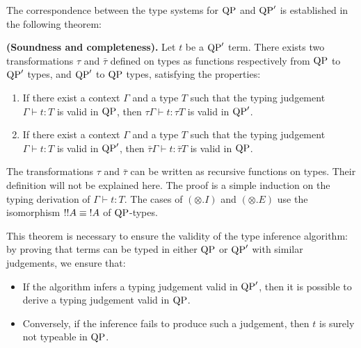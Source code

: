The correspondence between the type systems for ${\rm QP}$ and ${\rm QP}'$ is established in the following theorem:

\begin{thm}{\bf (Soundness and completeness).} Let $t$ be a ${\rm QP}'$ term. There exists two transformations $\tau$ and
	$\bar \tau$ defined on types as functions respectively from ${\rm QP}$ to ${\rm QP}'$ types, and ${\rm QP}'$ to ${\rm QP}$ types, satisfying the properties:
	\begin{enumerate}
		\item If there exist a context $\Gamma$ and a type $T$ such that the typing judgement $\Gamma \vdash t : T$ is valid in ${\rm QP}$, then
			$\tau\Gamma \vdash t : \tau T$ is valid in ${\rm QP}'$.
		\item If there exist a context $\Gamma$ and a type $T$ such that the typing judgement $\Gamma \vdash t : T$ is valid in ${\rm QP}'$, then
			$\bar \tau \Gamma \vdash t : \bar \tau T$ is valid in ${\rm QP}$.
	\end{enumerate}
	
	\begin{proofsketch}
		The transformations $\tau$ and $\bar \tau$ can be written as recursive functions on types. Their definition will not be explained
		here. The proof is a simple induction on the typing derivation of $\Gamma \vdash t : T$. The cases of $(\otimes.I)$ and
		$(\otimes.E)$ use the isomorphism ${!}{!} A \equiv {!} A$ of ${\rm QP}$-types.
	\end{proofsketch}
\end{thm}

\begin{remark}
	This theorem is necessary to ensure the validity of the type inference algorithm: by proving that
	terms can be typed in either ${\rm QP}$ or ${\rm QP}'$ with similar judgements, we ensure that:
	\begin{itemize}
		\item If the algorithm infers a typing judgement valid in ${\rm QP}'$, then it is possible to derive a typing judgement valid in ${\rm QP}$.
		\item Conversely, if the inference fails to produce such a judgement, then $t$ is surely not typeable in ${\rm QP}$.
	\end{itemize}
\end{remark}

